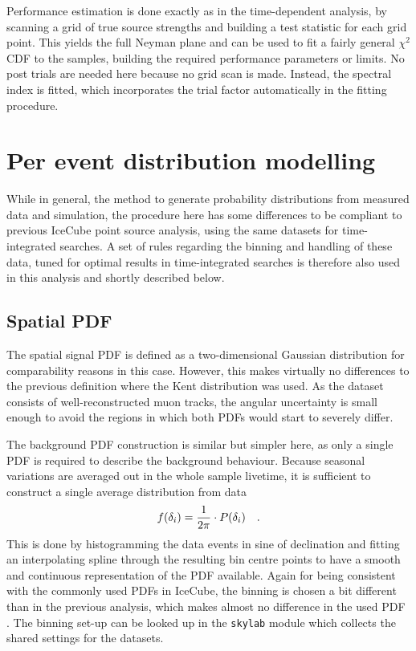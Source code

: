 Performance estimation is done exactly as in the time-dependent analysis, by scanning a grid of true source strengths and building a test statistic for each grid point.
This yields the full Neyman plane and can be used to fit a fairly general $\chi^2$ CDF to the samples, building the required performance parameters or limits.
No post trials are needed here because no grid scan is made.
Instead, the spectral index is fitted, which incorporates the trial factor automatically in the fitting procedure.


\section{Per event distribution modelling}
While in general, the method to generate probability distributions from measured data and simulation, the procedure here has some differences to be compliant to previous IceCube point source analysis, using the same datasets for time-integrated searches.
A set of rules regarding the binning and handling of these data, tuned for optimal results in time-integrated searches is therefore also used in this analysis and shortly described below.

\subsection*{Spatial PDF}
The spatial signal PDF is defined as a two-dimensional Gaussian distribution for comparability reasons in this case.
However, this makes virtually no differences to the previous definition where the Kent distribution was used.
As the dataset consists of well-reconstructed muon tracks, the angular uncertainty is small enough to avoid the regions in which both PDFs would start to severely differ.

The background PDF construction is similar but simpler here, as only a single PDF is required to describe the background behaviour.
Because seasonal variations are averaged out in the whole sample livetime, it is sufficient to construct a single average distribution from data
\begin{equation}
  f(\delta_i) = \frac{1}{2\pi}\cdot P(\delta_i)
  \quad\text{.}
\end{equation}
This is done by histogramming the data events in sine of declination and fitting an interpolating spline through the resulting bin centre points to have a smooth and continuous representation of the PDF available.
Again for being consistent with the commonly used PDFs in IceCube, the binning is chosen a bit different than in the previous analysis, which makes almost no difference in the used PDF .
The binning set-up can be looked up in the \lstinline!skylab! module which collects the shared settings for the datasets.

